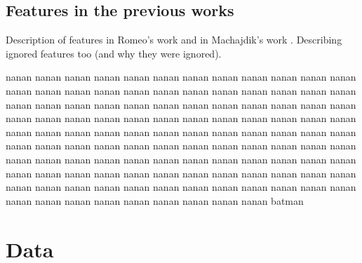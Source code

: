 \documentclass[11pt,a4paper,draft]{report}
\begin{document}
\begin{multicols}{2}
\section{Features in the previous works}

Description of features in Romeo's work \cite{rmc12ajs} and in Machajdik's work
\cite{mach10clas}.  Describing ignored features too (and why they were
ignored).

nanan nanan nanan nanan nanan nanan nanan nanan nanan nanan nanan nanan nanan
nanan nanan nanan nanan nanan nanan nanan nanan nanan nanan nanan nanan nanan
nanan nanan nanan nanan nanan nanan nanan nanan nanan nanan nanan nanan nanan
nanan nanan nanan nanan nanan nanan nanan nanan nanan nanan nanan nanan nanan
nanan nanan nanan nanan nanan nanan nanan nanan nanan nanan nanan nanan nanan
nanan nanan nanan nanan nanan nanan nanan nanan nanan nanan nanan nanan nanan
nanan nanan nanan nanan nanan nanan nanan nanan nanan nanan nanan nanan nanan
nanan nanan nanan nanan nanan nanan nanan nanan nanan nanan nanan nanan nanan
nanan nanan nanan nanan nanan nanan nanan nanan nanan nanan nanan nanan nanan
batman

\end{multicols}

\chapter{Data}
\end{document}
